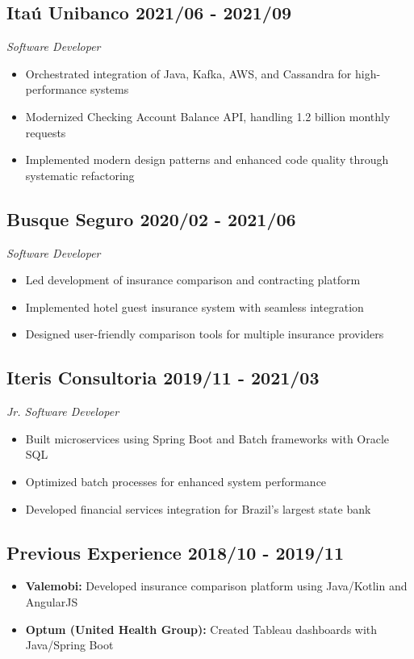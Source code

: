 \documentclass[a4paper,10pt]{article}
\begin{document}
\subsection*{\textcolor{primaryblue}{Itaú Unibanco} \hfill 2021/06 - 2021/09}
\textit{Software Developer}
\begin{itemize}
    \item Orchestrated integration of Java, Kafka, AWS, and Cassandra for high-performance systems
    \item Modernized Checking Account Balance API, handling 1.2 billion monthly requests
    \item Implemented modern design patterns and enhanced code quality through systematic refactoring
\end{itemize}

\subsection*{\textcolor{primaryblue}{Busque Seguro} \hfill 2020/02 - 2021/06}
\textit{Software Developer}
\begin{itemize}
    \item Led development of insurance comparison and contracting platform
    \item Implemented hotel guest insurance system with seamless integration
    \item Designed user-friendly comparison tools for multiple insurance providers
\end{itemize}

\subsection*{\textcolor{primaryblue}{Iteris Consultoria} \hfill 2019/11 - 2021/03}
\textit{Jr. Software Developer}
\begin{itemize}
    \item Built microservices using Spring Boot and Batch frameworks with Oracle SQL
    \item Optimized batch processes for enhanced system performance
    \item Developed financial services integration for Brazil's largest state bank
\end{itemize}

\subsection*{\textcolor{primaryblue}{Previous Experience} \hfill 2018/10 - 2019/11}
\begin{itemize}
    \item \textbf{Valemobi:} Developed insurance comparison platform using Java/Kotlin and AngularJS
    \item \textbf{Optum (United Health Group):} Created Tableau dashboards with Java/Spring Boot
\end{itemize}
\end{document}
